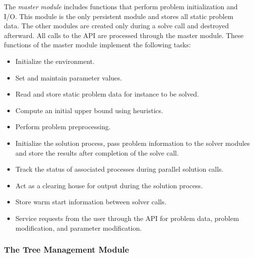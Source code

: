 The {\em master module} includes functions that perform problem initialization
and I/O. This module is the only persistent module and stores all static
problem data. The other modules are created only during a solve call and
destroyed afterward. All calls to the API are processed through the master
module. These functions of the master module implement the following tasks:
\begin{itemize}
        \item Initialize the environment.
        \item Set and maintain parameter values.
        \item Read and store static problem data for instance to be solved.
        \item Compute an initial upper bound using heuristics.
        \item Perform problem preprocessing.
        \item Initialize the solution process, pass problem information to the
        solver modules and store the results after completion of the solve 
	call.
        \item Track the status of associated processes during parallel
        solution calls.
        \item Act as a clearing house for output during the solution process.
        \item Store warm start information between solver calls.
        \item Service requests from the user through the API for problem data,
        problem modification, and parameter modification.
\end{itemize}

\subsubsection{The Tree Management Module}

